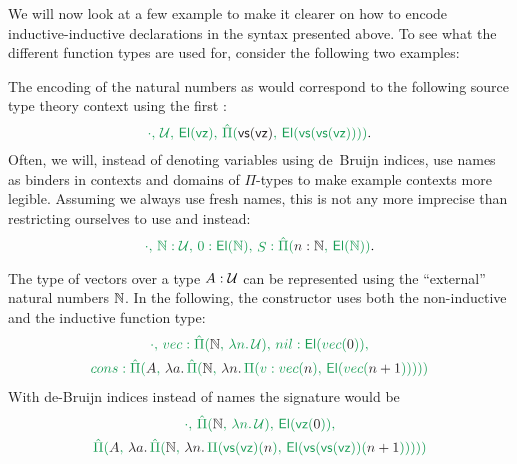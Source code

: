 We will now look at a few example to make it clearer on how to encode inductive-inductive
declarations in the syntax presented above. %
To see what the different function types are used for, consider the following two
examples:

\begin{example}\label{ex:ii-syntax-nat}
The encoding of the natural numbers as would correspond to the
following source type theory context using the first :
\begin{equation*}
\grm{
\cdot,\, \UU,\, \El(\vz),\, \ExtPi{\vs(\vz)}{\El(\vs(\vs(\vz)))}
}\text{.}
\end{equation*}
Often, we will, instead of denoting variables using de~Bruijn indices, use names
as binders in contexts and domains of $\Pi$-types to make example contexts more
legible.
Assuming we always use fresh names, this is not any more imprecise than restricting
ourselves to use \grm{\vz} and \grm{\vz} instead:
\begin{equation*}
\grm{
\cdot,\, \N : \UU,\, 0 : \El(\N),\, \mathop{S} : \ExtPi{n : \N}{\El(\N)}
}\text{.}
\end{equation*}
\end{example}

\begin{example}[Vectors]\label{ex:ii-syntax-vec}
The type of vectors over a type $A : \mathcal{U}$ can be represented using the ``external''
natural numbers $\mathbb{N}$.
In the following, the constructor  uses both the non-inductive
and the inductive function type:
\begin{equation*}
\begin{gathered}
\grm{ \cdot,\, \mathop{vec} : \ExtPi{\N}{\lambda n.\, \UU},\, \mathop{nil} : \El(\mathop{vec}(\blm{0})),} \\
\grm{ \mathop{cons} : \ExtPi{A}{\blm{\lambda a.\,
  \grm{\ExtPi{\N}{\blm{\lambda n.\, \grm{\Pi(v : \mathop{vec}(\blm{n}),\, \El(\mathop{vec}(\blm{n + 1})))}}}}}}}
\end{gathered}
\end{equation*}
With de-Bruijn indices instead of names the signature  would be
\begin{equation*}
\begin{gathered}
\grm{ \cdot,\, \ExtPi{\N}{\lambda n.\, \UU},\, \El(\vz(\blm{0})),} \\
\grm{ \ExtPi{A}{\blm{\lambda a.\,
  \grm{\ExtPi{\N}{\blm{\lambda n.\, \grm{\Pi(\vs(\vz)(\blm{n}),\, \El(\vs(\vs(\vz))(\blm{n + 1})))}}}}}}}
\end{gathered}
\end{equation*}
\end{example}

